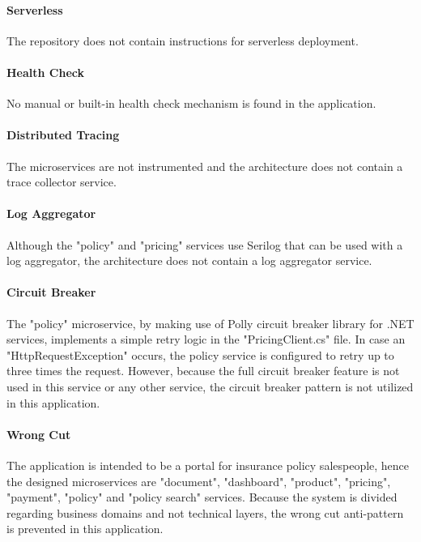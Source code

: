 \documentclass{Configuration_Files/PoliMi3i_thesis}
\begin{document}
\paragraph{Serverless} The repository does not contain instructions for serverless deployment.

\paragraph{Health Check} No manual or built-in health check mechanism is found in the application.

\paragraph{Distributed Tracing} The microservices are not instrumented and the architecture does not contain a trace collector service.

\paragraph{Log Aggregator} Although the "policy" and "pricing" services use Serilog that can be used with a log aggregator, the architecture does not contain a log aggregator service.

\paragraph{Circuit Breaker} The "policy" microservice, by making use of Polly\footnotemark[106] circuit breaker library for .NET services, implements a simple retry logic in the "PricingClient.cs" file.
In case an "HttpRequestException" occurs, the policy service is configured to retry up to three times the request.
However, because the full circuit breaker feature is not used in this service or any other service, the circuit breaker pattern is not utilized in this application.

\paragraph{Wrong Cut} The application is intended to be a portal for insurance policy salespeople, hence the designed microservices are "document", "dashboard", "product", "pricing", "payment", "policy" and "policy search" services.
Because the system is divided regarding business domains and not technical layers, the wrong cut anti-pattern is prevented in this application.
\end{document}
